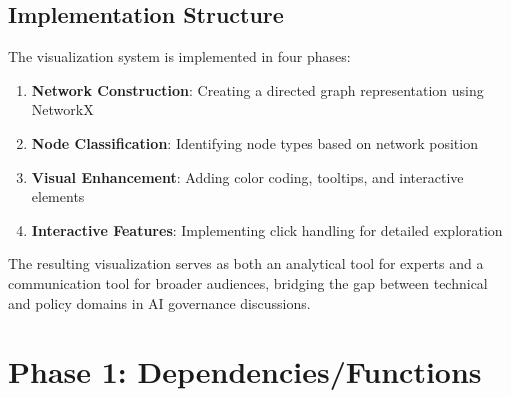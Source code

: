 \documentclass[
  11pt,
  letterpaper,
]{book}
\providecommand{\tightlist}{%
  \setlength{\itemsep}{0pt}\setlength{\parskip}{0pt}}
\begin{document}
\subsection{Implementation Structure}\label{implementation-structure}

The visualization system is implemented in four phases:

\begin{enumerate}
\def\labelenumi{\arabic{enumi}.}
\tightlist
\item
  \textbf{Network Construction}: Creating a directed graph
  representation using NetworkX
\item
  \textbf{Node Classification}: Identifying node types based on network
  position
\item
  \textbf{Visual Enhancement}: Adding color coding, tooltips, and
  interactive elements
\item
  \textbf{Interactive Features}: Implementing click handling for
  detailed exploration
\end{enumerate}

The resulting visualization serves as both an analytical tool for
experts and a communication tool for broader audiences, bridging the gap
between technical and policy domains in AI governance discussions.

\section{Phase 1:
Dependencies/Functions}\label{phase-1-dependenciesfunctions}
\end{document}
